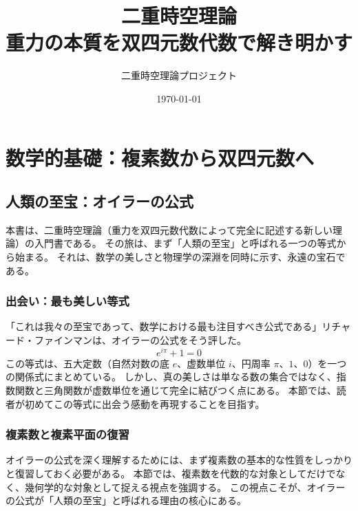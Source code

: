 \documentclass[dvipdfmx,a4paper]{jsbook}
\title{\Huge 二重時空理論\\[2ex] \Large 重力の本質を双四元数代数で解き明かす}
\author{二重時空理論プロジェクト}
\date{\today}
\theoremstyle{definition}
\theoremstyle{remark}
\begin{document}
\frontmatter
\maketitle

\begin{singlespace}
\tableofcontents
\end{singlespace}

\mainmatter

\part{数学的基礎：複素数から双四元数へ}

\chapter{人類の至宝：オイラーの公式}
\label{chap:euler}

本書は、二重時空理論（重力を双四元数代数によって完全に記述する新しい理論）の入門書である。
その旅は、まず「人類の至宝」と呼ばれる一つの等式から始まる。
それは、数学の美しさと物理学の深淵を同時に示す、永遠の宝石である。

\section{出会い：最も美しい等式}
\label{sec:euler-introduction}

「これは我々の至宝であって、数学における最も注目すべき公式である」リチャード・ファインマンは、オイラーの公式をそう評した。
\begin{equation}
  e^{i\pi} + 1 = 0
  \label{eq:euler-identity}
\end{equation}
この等式は、五大定数（自然対数の底 $e$、虚数単位 $i$、円周率 $\pi$、$1$、$0$）を一つの関係式にまとめている。
しかし、真の美しさは単なる数の集合ではなく、指数関数と三角関数が虚数単位を通じて完全に結びつく点にある。
本節では、読者が初めてこの等式に出会う感動を再現することを目指す。

\section{複素数と複素平面の復習}
\label{sec:complex-review}

オイラーの公式を深く理解するためには、まず複素数の基本的な性質をしっかりと復習しておく必要がある。
本節では、複素数を代数的な対象としてだけでなく、幾何学的な対象として捉える視点を強調する。
この視点こそが、オイラーの公式が「人類の至宝」と呼ばれる理由の核心にある。
\end{document}
